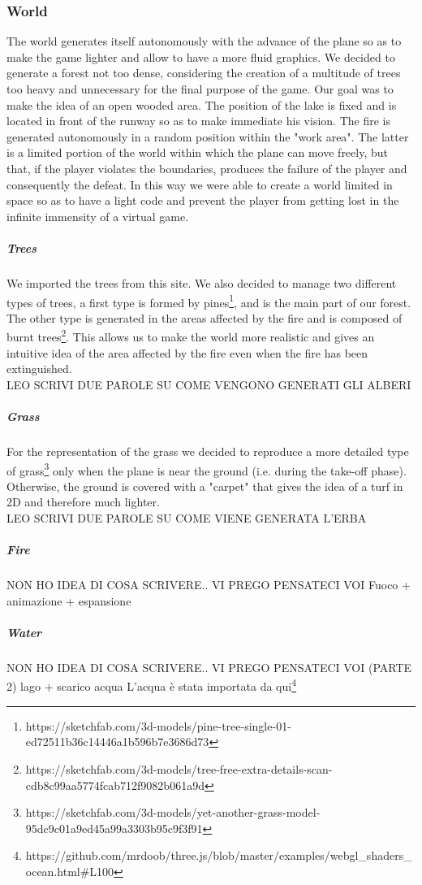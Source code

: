 \documentclass{article}
\begin{document}
\subsubsection*{World}
The world generates itself autonomously with the advance of the plane so as to make the game lighter and allow to have a more fluid graphics. We decided to generate a forest not too dense, considering the creation of a multitude of trees too heavy and unnecessary for the final purpose of the game. Our goal was to make the idea of an open wooded area. The position of the lake is fixed and is located in front of the runway so as to make immediate his vision. The fire is generated autonomously in a random position within the "work area". The latter is a limited portion of the world within which the plane can move freely, but that, if the player violates the boundaries, produces the failure of the player and consequently the defeat. In this way we were able to create a world limited in space so as to have a light code and prevent the player from getting lost in the infinite immensity of a virtual game.

\subparagraph*{Trees}
We imported the trees from this site. We also decided to manage two different types of trees, a first type is formed by pines\footnote{https://sketchfab.com/3d-models/pine-tree-single-01-ed72511b36c14446a1b596b7e3686d73}, and is the main part of our forest. The other type is generated in the areas affected by the fire and is composed of burnt trees\footnote{https://sketchfab.com/3d-models/tree-free-extra-details-scan-cdb8c99aa5774fcab712f9082b061a9d}. This allows us to make the world more realistic and gives an intuitive idea of the area affected by the fire even when the fire has been extinguished. \\
LEO SCRIVI DUE PAROLE SU COME VENGONO GENERATI GLI ALBERI

\subparagraph*{Grass}
For the representation of the grass we decided to reproduce a more detailed type of grass\footnote{https://sketchfab.com/3d-models/yet-another-grass-model-95dc9c01a9ed45a99a3303b95c9f3f91} only when the plane is near the ground (i.e. during the take-off phase). Otherwise, the ground is covered with a "carpet" that gives the idea of a turf in 2D and therefore much lighter. \\
LEO SCRIVI DUE PAROLE SU COME VIENE GENERATA L'ERBA

\subparagraph*{Fire}
NON HO IDEA DI COSA SCRIVERE.. VI PREGO PENSATECI VOI
Fuoco + animazione + espansione

\subparagraph*{Water}
NON HO IDEA DI COSA SCRIVERE.. VI PREGO PENSATECI VOI (PARTE 2)
lago + scarico acqua
L'acqua è stata importata da qui\footnote{https://github.com/mrdoob/three.js/blob/master/examples/webgl\_shaders\_ocean.html\#L100}
\end{document}
